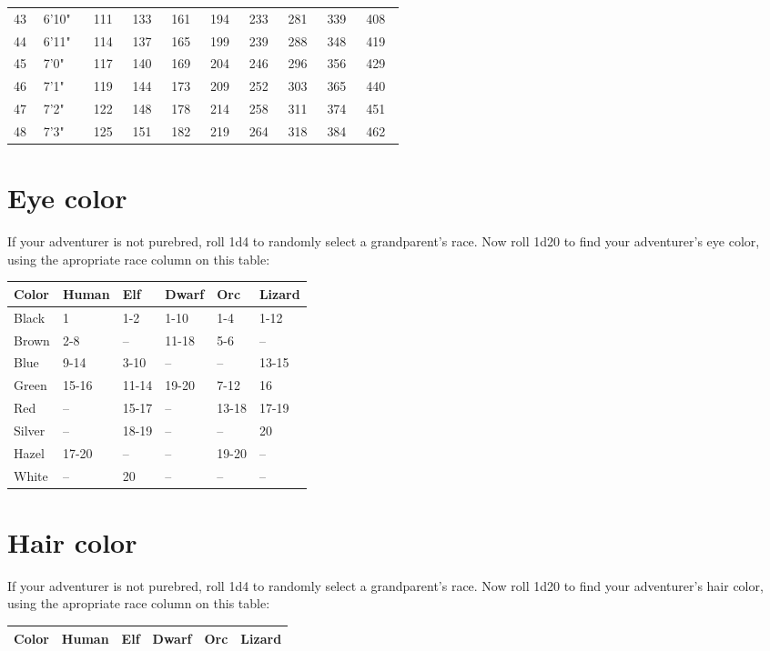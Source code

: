 \begin{multicols*}{2}
\begin{tcolorbox}[breakable,boxrule=0pt]
\begin{tabular}{ p{0.03\linewidth} p{0.07\linewidth} p{0.05\linewidth} p{0.05\linewidth} p{0.05\linewidth} p{0.05\linewidth} p{0.05\linewidth} p{0.05\linewidth} p{0.05\linewidth} p{0.05\linewidth} }
43 & 6'10" & 111 & 133 & 161 & 194 & 233 & 281 & 339 & 408\\
44 & 6'11" & 114 & 137 & 165 & 199 & 239 & 288 & 348 & 419\\
45 & 7'0" & 117 & 140 & 169 & 204 & 246 & 296 & 356 & 429\\
46 & 7'1" & 119 & 144 & 173 & 209 & 252 & 303 & 365 & 440\\
47 & 7'2" & 122 & 148 & 178 & 214 & 258 & 311 & 374 & 451\\
48 & 7'3" & 125 & 151 & 182 & 219 & 264 & 318 & 384 & 462\\
\end{tabular}
\end{tcolorbox}
\normalsize
\section{Eye color}
If your adventurer is not purebred, roll 1d4 to randomly select a grandparent's race. Now roll 1d20 to find your adventurer's eye color, using the apropriate race column on this table:

\begin{tcolorbox}[breakable,boxrule=0pt,after skip=0pt,before skip=5pt]
\begin{tabular}{l l l l l l}
Color & Human & Elf & Dwarf & Orc & Lizard\\
\midrule
Black & 1 & 1-2 & 1-10 & 1-4 & 1-12\\
Brown & 2-8 & -- & 11-18 & 5-6 & --\\
Blue & 9-14 & 3-10 & -- & -- & 13-15\\
Green & 15-16 & 11-14 & 19-20 & 7-12 & 16\\
Red & -- & 15-17 & -- & 13-18 & 17-19\\
Silver & -- & 18-19 & -- & -- & 20\\
Hazel & 17-20 & -- & -- & 19-20 & --\\
White & -- & 20 & -- & -- & --
\end{tabular}
\end{tcolorbox}
\section{Hair color}
If your adventurer is not purebred, roll 1d4 to randomly select a grandparent's race. Now roll 1d20 to find your adventurer's hair color, using the apropriate race column on this table:
\begin{tcolorbox}[breakable,boxrule=0pt,after skip=0pt,before skip=5pt]
\begin{tabular}{l l l l l l}
Color & Human & Elf & Dwarf & Orc & Lizard\\
\midrule


\end{tabular}
\end{tcolorbox}
\end{multicols*}
